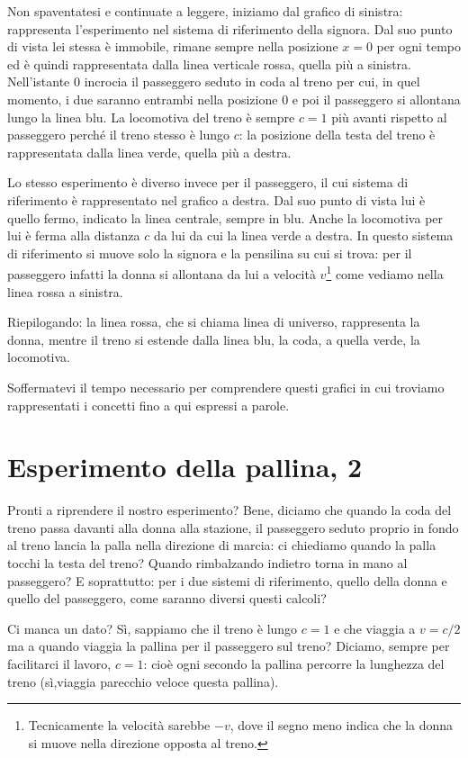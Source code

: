 Non spaventatesi e continuate a leggere, iniziamo dal grafico di sinistra: rappresenta l'esperimento nel sistema di riferimento della signora. Dal suo punto di vista lei stessa è immobile, rimane sempre nella posizione $x=0$ per ogni tempo ed è quindi rappresentata dalla linea verticale rossa, quella più a sinistra. Nell'istante $0$ incrocia il passeggero seduto in coda al treno per cui, in quel momento, i due saranno entrambi nella posizione $0$ e poi il passeggero si allontana lungo la linea blu. La locomotiva del treno è sempre $c=1$ più avanti rispetto al passeggero perché il treno stesso è lungo $c$: la posizione della testa del treno è rappresentata dalla linea verde, quella più a destra.

Lo stesso esperimento è diverso invece per il passeggero, il cui sistema di riferimento è rappresentato nel grafico a destra. Dal suo punto di vista lui è quello fermo, indicato la linea centrale, sempre in blu. Anche la locomotiva per lui è ferma alla distanza $c$ da lui da cui la linea verde a destra. In questo sistema di riferimento si muove solo la signora e la pensilina su cui si trova: per il passeggero infatti la donna si allontana da lui a velocità $v$\footnote{Tecnicamente la velocità sarebbe $-v$, dove il segno meno indica che la donna si muove nella direzione opposta al treno.} come vediamo nella linea rossa a sinistra.

Riepilogando: la linea rossa, che si chiama linea di universo, rappresenta la donna, mentre il treno si estende dalla linea blu, la coda, a quella verde, la locomotiva.

Soffermatevi il tempo necessario per comprendere questi grafici in cui troviamo rappresentati i concetti fino a qui espressi a parole.

\section{Esperimento della pallina, 2}

Pronti a riprendere il nostro esperimento? Bene, diciamo che quando la coda del treno passa davanti alla donna alla stazione, il passeggero seduto proprio in fondo al treno lancia la palla nella direzione di marcia: ci chiediamo quando la palla tocchi la testa del treno? Quando rimbalzando indietro torna in mano al passeggero? E soprattutto: per i due sistemi di riferimento, quello della donna e quello del passeggero, come saranno diversi questi calcoli?

Ci manca un dato? Sì, sappiamo che il treno è lungo $c=1$ e che viaggia a $v=c/2$ ma a quando viaggia la pallina per il passeggero sul treno? Diciamo, sempre per facilitarci il lavoro, $c=1$: cioè ogni secondo la pallina percorre la lunghezza del treno (sì,viaggia parecchio veloce questa pallina).

